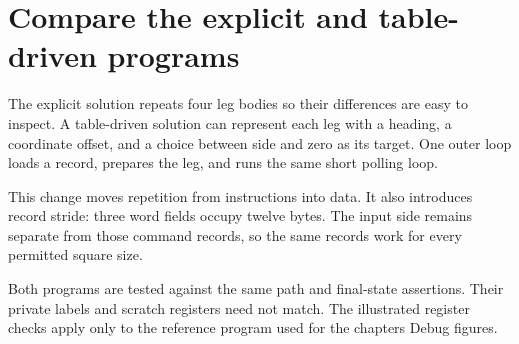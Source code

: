 \section{Compare the explicit and table-driven
  programs}\label{006-marsbot-square-p10-compare-the-explicit-and-table-driven-programs}

The explicit solution repeats four leg bodies so their differences are
easy to inspect. A table-driven solution can represent each leg with a
heading, a coordinate offset, and a choice between side and zero as its
target. One outer loop loads a record, prepares the leg, and runs the
same short polling loop.

This change moves repetition from instructions into data. It also
introduces record stride: three word fields occupy twelve bytes. The
input side remains separate from those command records, so the same
records work for every permitted square size.

Both programs are tested against the same path and final-state
assertions. Their private labels and scratch registers need not match.
The illustrated register checks apply only to the reference program used
for the chapter\textquotesingle s Debug figures.
